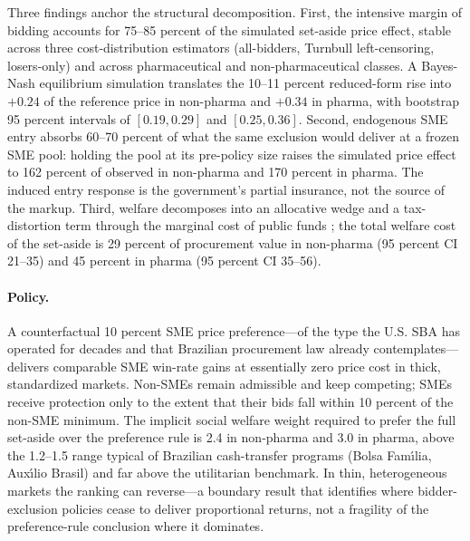 Three findings anchor the structural decomposition. First, the intensive margin of bidding accounts for 75--85 percent of the simulated set-aside price effect, stable across three cost-distribution estimators (all-bidders, Turnbull left-censoring, losers-only) and across pharmaceutical and non-pharmaceutical classes. A Bayes-Nash equilibrium simulation translates the 10--11 percent reduced-form rise into $+0.24$ of the reference price in non-pharma and $+0.34$ in pharma, with bootstrap 95 percent intervals of $[0.19, 0.29]$ and $[0.25, 0.36]$. Second, endogenous SME entry absorbs 60--70 percent of what the same exclusion would deliver at a frozen SME pool: holding the pool at its pre-policy size raises the simulated price effect to 162 percent of observed in non-pharma and 170 percent in pharma. The induced entry response is the government's partial insurance, not the source of the markup. Third, welfare decomposes into an allocative wedge and a tax-distortion term through the marginal cost of public funds \citep{ballard1985}; the total welfare cost of the set-aside is 29 percent of procurement value in non-pharma (95 percent CI 21--35) and 45 percent in pharma (95 percent CI 35--56).

\paragraph{Policy.} A counterfactual 10 percent SME price preference---of the type the U.S. SBA has operated for decades and that Brazilian procurement law already contemplates---delivers comparable SME win-rate gains at essentially zero price cost in thick, standardized markets. Non-SMEs remain admissible and keep competing; SMEs receive protection only to the extent that their bids fall within 10 percent of the non-SME minimum. The implicit social welfare weight required to prefer the full set-aside over the preference rule is 2.4 in non-pharma and 3.0 in pharma, above the 1.2--1.5 range typical of Brazilian cash-transfer programs (Bolsa Fam\'{\i}lia, Aux\'{\i}lio Brasil) and far above the utilitarian benchmark. In thin, heterogeneous markets the ranking can reverse---a boundary result that identifies where bidder-exclusion policies cease to deliver proportional returns, not a fragility of the preference-rule conclusion where it dominates.

